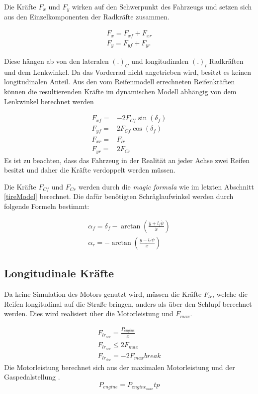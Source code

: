 \documentclass{like}
\begin{document}
Die Kräfte \(F_{x}\) und \(F_{y}\) wirken auf den Schwerpunkt des Fahrzeugs und setzen sich aus den Einzelkomponenten der Radkräfte zusammen.

\begin{eqnarray}
F_x = F_{xf} + F_{xr} \\
F_y = F_{yf} + F_{yr}
\end{eqnarray}

Diese hängen ab von den lateralen \((.)_C\) und longitudinalen \((.)_l\)    Radkräften und dem Lenkwinkel. Da das Vorderrad nicht angetrieben wird, besitzt es keinen longitudinalen Anteil. Aus den vom Reifenmodell errechneten Reifenkräften können die resultierenden Kräfte im dynamischen Modell abhängig von dem Lenkwinkel berechnet werden

\begin{eqnarray}
F_{xf} =& - 2 F_{Cf} \sin(\delta_f) \\
F_{yf} =& 2 F_{Cf} \cos(\delta_f) \\
F_{xr} =&   F_{lr} \\
F_{yr} =& 2 F_{Cr}
\end{eqnarray}
Es ist zu beachten, dass das Fahrzeug in der Realität an jeder Achse zwei Reifen besitzt und daher die Kräfte verdoppelt werden müssen.


Die Kräfte \(F_{Cf}\) und \(F_{Cr}\) werden durch die \textit{magic formula} wie im letzten Abschnitt \ref{tireModel} berechnet.
Die dafür benötigten Schräglaufwinkel werden durch folgende Formeln bestimmt:

\begin{eqnarray}
\alpha_f = \delta_f - \arctan \left(\frac{\dot{y} + l_f \dot{\psi}}{\dot{x}} \right) \\
\alpha_r = - \arctan \left(\frac{\dot{y} - l_r \dot{\psi}}{\dot{x}} \right)
\end{eqnarray}

\subsection*{Longitudinale Kräfte}
Da keine Simulation des Motors genutzt wird, müssen die Kräfte \(F_{lr}\), welche die Reifen longitudinal auf die Straße bringen, anders als über den Schlupf berechnet werden.
Dies wird realisiert über die Motorleistung und \(F_{max}\).

\begin{eqnarray}
F_{lr_{acc}} = \frac{P_{engine}}{|\dot{x}|} \label{long_dyn_engine}\\
F_{lr_{acc}}\leq 2 F_{max} \label{long_dyn_max}\\
F_{lr_{dec}} = - 2 F_{max}  break
\end{eqnarray}
Die Motorleistung berechnet sich aus der maximalen Motorleistung und der Gaspedalstellung .
\begin{equation}
	P_{engine} = P_{engine_{max}} tp
\end{equation}
\end{document}
